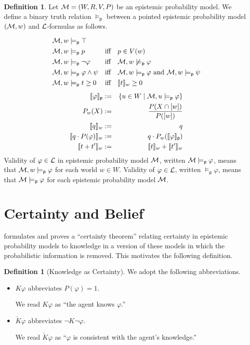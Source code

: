 \documentclass[12pt]{article}
\theoremstyle{definition}
\newtheorem{definition}[theorem]{Definition}
\newcommand{\M}{{\cal M}}      %
\newcommand{\Lang}{{\cal L}}   %
\newcommand{\sem}[1]{\llbracket{#1}\rrbracket}               %
\newcommand{\modelsp}{\models_{\mathsf{p}}}                  %
\newcommand{\semp}[1]{\llbracket{#1}\rrbracket_{\mathsf{p}}} %
\begin{document}
\begin{definition} 
  Let $\M=(W,R,V,P)$ be an epistemic probability model.  We define
  a binary truth relation $\modelsp$ between a pointed epistemic
  probability model $(\M,w)$ and $\Lang$-formulas as follows.
  \[
  \renewcommand{\arraystretch}{1.3}
  \begin{array}{lcl}
    \M,w\modelsp\top 
    \\
    \M,w\modelsp p & \text{iff} & 
    p \in V(w) 
    \\
    \M,w\modelsp\neg\varphi & \text{iff} &
    \M,w\not\modelsp\varphi
    \\
    \M,w\modelsp\varphi\land\psi & \text{iff} &
    \M,w\modelsp\varphi \text{ and } \M,w\modelsp\psi
    \\
    \M,w\modelsp t\geq 0 & \text{iff} &
    \sem{t}_w\geq 0
  \end{array}
  \]
  \begin{eqnarray*}
    \semp{\varphi} & := &
    \{ u \in W\mid \M,u\modelsp\varphi \}
    \\
    P_w(X) & := & 
    \displaystyle\frac{P(X\cap[w])}{P([w])}
    \\
    \sem{q}_w & := & q
    \\
    \sem{q\cdot P(\varphi)}_w & := & 
    q\cdot P_w(\semp{\varphi}) 
    \\
    \sem{t+t'}_w & := &
    \sem{t}_w + \sem{t'}_w
  \end{eqnarray*}
  Validity of $\varphi\in\Lang$ in epistemic probability model $\M$,
  written $\M\modelsp\varphi$, means that $\M,w\modelsp\varphi$ for each
  world $w\in W$.  Validity of $\varphi\in\Lang$, written $\modelsp\varphi$,
  means that $\M\modelsp\varphi$ for each epistemic probability model
  $\M$.
\end{definition} 

\section{Certainty and Belief} 
\label{Section:CB} 

\cite{Eijck2013:lap} formulates and proves a ``certainty theorem''
relating certainty in epistemic probability models to knowledge in a
version of these models in which the probabilistic information is
removed.  This motivates the following definition.

\begin{definition}[Knowledge as Certainty]
  We adopt the following abbreviations.
  \begin{itemize}
  \item $K\varphi$ abbreviates $P(\varphi)=1$. 

    We read $K\varphi$ as ``the agent knows $\varphi$.''

  \item $\check K\varphi$ abbreviates $\lnot K\lnot\varphi$.

    We read $\check K\varphi$ as ``$\varphi$ is consistent with the agent's
    knowledge.''
  \end{itemize}
\end{definition}
\end{document}
